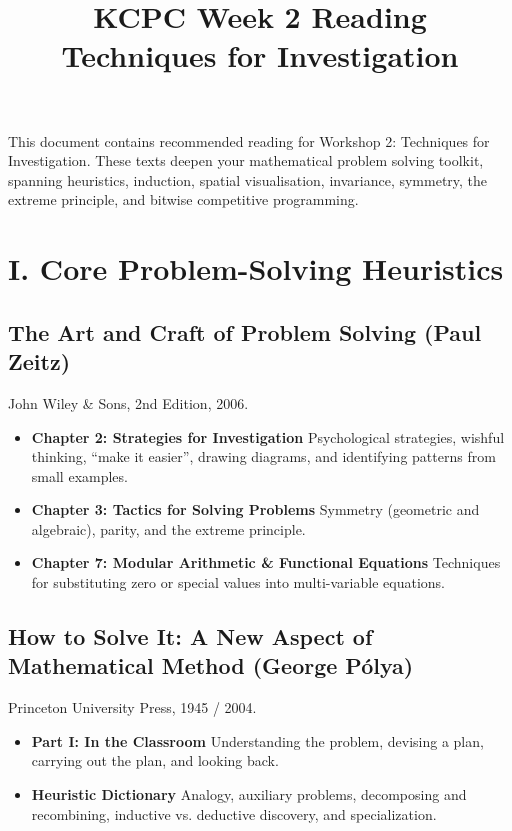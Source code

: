 \documentclass[11pt]{article}
\title{KCPC Week 2 Reading\\Techniques for Investigation}
\author{}
\date{}
\begin{document}
\maketitle
\thispagestyle{fancy}

\noindent
This document contains recommended reading for Workshop 2: Techniques for Investigation. These texts deepen your mathematical problem solving toolkit, spanning heuristics, induction, spatial visualisation, invariance, symmetry, the extreme principle, and bitwise competitive programming.

\section*{I. Core Problem-Solving Heuristics}

\subsection*{The Art and Craft of Problem Solving (Paul Zeitz)}
John Wiley \& Sons, 2nd Edition, 2006.

\begin{itemize}
    \item \textbf{Chapter 2: Strategies for Investigation} Psychological strategies, wishful thinking, ``make it easier'', drawing diagrams, and identifying patterns from small examples.
    \item \textbf{Chapter 3: Tactics for Solving Problems} Symmetry (geometric and algebraic), parity, and the extreme principle.
    \item \textbf{Chapter 7: Modular Arithmetic \& Functional Equations} Techniques for substituting zero or special values into multi-variable equations.
\end{itemize}

\subsection*{How to Solve It: A New Aspect of Mathematical Method (George P{\'o}lya)}
Princeton University Press, 1945 / 2004.

\begin{itemize}
    \item \textbf{Part I: In the Classroom} Understanding the problem, devising a plan, carrying out the plan, and looking back.
    \item \textbf{Heuristic Dictionary} Analogy, auxiliary problems, decomposing and recombining, inductive vs. deductive discovery, and specialization.
\end{itemize}
\end{document}
